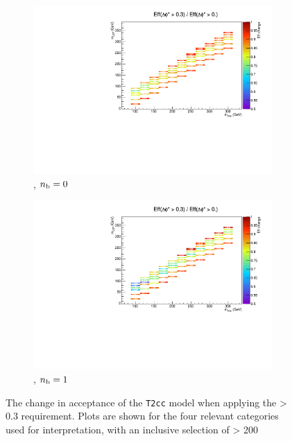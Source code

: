 \begin{figure}[h!]
\begin{subfigure}[b]{0.46\textwidth}
    \includegraphics[width=\textwidth]
    {Figs/sms/t2cc/v37/eff_changes/eff_compare_2d_T2cc_v37_vs_T2cc_v38_eq0b_ge4j}
    \caption{\njhigh, $n_{\text{b}} = 0$}
    \label{fig:t2cc_dphistar_eq0b_ge4j}
  \end{subfigure}
  \begin{subfigure}[b]{0.46\textwidth}
    \includegraphics[width=\textwidth]
    {Figs/sms/t2cc/v37/eff_changes/eff_compare_2d_T2cc_v37_vs_T2cc_v38_eq1b_ge4j}
    \caption{\njhigh, $n_{\text{b}} = 1$}
    \label{fig:t2cc_dphistar_eq1b_ge4j}
  \end{subfigure}
  \caption{The change in acceptance of the \texttt{T2cc} model when applying
  the \mindphistar > 0.3 requirement. Plots are shown for the four relevant
  categories used for interpretation, with an inclusive selection of \HT > 200
  \gev}
  \label{fig:t2cc_dphistar_effchange}
\end{figure}

